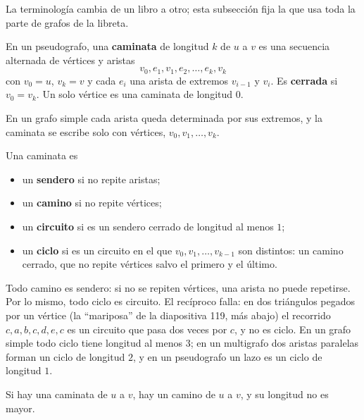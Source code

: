 \documentclass[11pt,letterpaper]{article}
\begin{document}
La terminología cambia de un libro a otro; esta subsección fija la
que usa toda la parte de grafos de la libreta.

\begin{definicion}[Caminata]
  \label{def:caminata}
  En un pseudografo, una \textbf{caminata} de longitud $k$ de $u$ a $v$
  es una secuencia alternada de vértices y aristas
  \[
    v_0, e_1, v_1, e_2, \dots, e_k, v_k
  \]
  con $v_0 = u$, $v_k = v$ y cada $e_i$ una arista de extremos
  $v_{i-1}$ y $v_i$. Es \textbf{cerrada} si $v_0 = v_k$. Un solo
  vértice es una caminata de longitud $0$.
\end{definicion}

En un grafo simple cada arista queda determinada por sus extremos, y
la caminata se escribe solo con vértices, $v_0, v_1, \dots, v_k$.

\begin{definicion}
  \label{def:sendero-ciclo}
  Una caminata es
  \begin{itemize}[itemsep=0.1em]
    \item un \textbf{sendero} si no repite aristas;
    \item un \textbf{camino} si no repite vértices;
    \item un \textbf{circuito} si es un sendero cerrado de longitud al
          menos $1$;
    \item un \textbf{ciclo} si es un circuito en el que
          $v_0, v_1, \dots, v_{k-1}$ son distintos: un camino cerrado,
          que no repite vértices salvo el primero y el último.
  \end{itemize}
\end{definicion}

Todo camino es sendero: si no se repiten vértices, una arista no puede
repetirse. Por lo mismo, todo ciclo es circuito. El recíproco falla:
en dos triángulos pegados por un vértice (la ``mariposa'' de la
diapositiva 119, más abajo) el recorrido $c, a, b, c, d, e, c$ es un
circuito que pasa dos veces por $c$, y no es ciclo. En un grafo simple
todo ciclo tiene longitud al menos $3$; en un multigrafo dos aristas
paralelas forman un ciclo de longitud $2$, y en un pseudografo un lazo
es un ciclo de longitud $1$.

\begin{lema}
  \label{lem:caminata-camino}
  Si hay una caminata de $u$ a $v$, hay un camino de $u$ a $v$, y su
  longitud no es mayor.
\end{lema}
\end{document}
